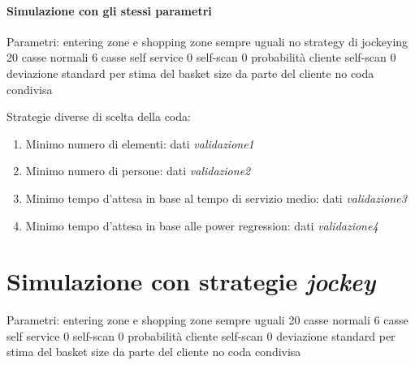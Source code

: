 \paragraph{Simulazione con gli stessi parametri}

Parametri:
entering zone e shopping zone sempre uguali
no strategy di jockeying
20 casse normali
6 casse self service
0 self-scan
0 probabilità cliente self-scan
0 deviazione standard per stima del basket size da parte del cliente
no coda condivisa

Strategie diverse di scelta della coda:
\begin{enumerate}
	\item Minimo numero di elementi: dati \textit{validazione1}
	\item Minimo numero di persone: dati \textit{validazione2}
	\item Minimo tempo d'attesa in base al tempo di servizio medio: dati \textit{validazione3}
	\item Minimo tempo d'attesa in base alle power regression: dati \textit{validazione4} 
\end{enumerate}

\section{Simulazione con strategie \textit{jockey}}

Parametri:
entering zone e shopping zone sempre uguali
20 casse normali
6 casse self service
0 self-scan
0 probabilità cliente self-scan
0 deviazione standard per stima del basket size da parte del cliente
no coda condivisa

